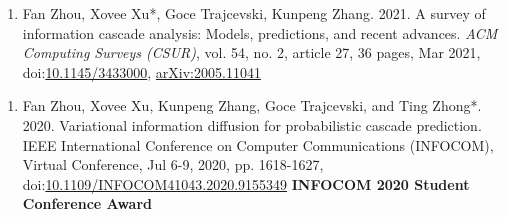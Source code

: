 

\begin{enumerate}[resume]
    \item Fan Zhou, Xovee Xu*, Goce Trajcevski, Kunpeng Zhang. 2021. A survey of information cascade analysis: Models, predictions, and recent advances. \textit{ACM Computing Surveys (CSUR)}, vol. 54, no. 2, article 27, 36 pages, Mar 2021, doi:\href{https://xovee.cn/html/paper-redirects/csur2021.html}{10.1145/3433000}, \href{https://arxiv.org/abs/2005.11041}{arXiv:2005.11041}
\end{enumerate}


\begin{enumerate}[resume]
    \item Fan Zhou, Xovee Xu, Kunpeng Zhang, Goce Trajcevski, and Ting Zhong*. 2020. Variational information diffusion for probabilistic cascade prediction. IEEE International Conference on Computer Communications (INFOCOM), Virtual Conference, Jul 6-9, 2020, pp. 1618-1627, doi:\href{https://doi.org/10.1109/INFOCOM41043.2020.9155349}{10.1109/INFOCOM41043.2020.9155349}
    \newline \textbf{\color{red}INFOCOM 2020 Student Conference Award}
\end{enumerate}